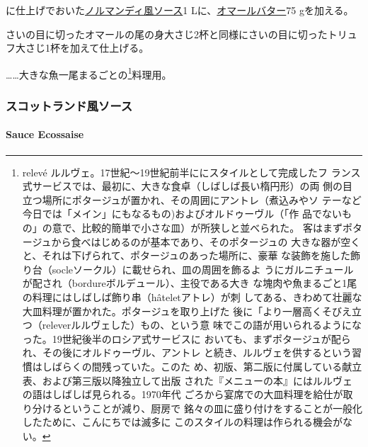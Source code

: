 \begin{recette}
に仕上げでおいた\protect\hyperlink{sauce-normande}{ノルマンディ風ソース}1
Lに、\protect\hyperlink{}{オマールバター}75 gを加える。

さいの目に切ったオマールの尾の身大さじ2杯と同様にさいの目に切ったトリュ
フ大さじ1杯を加えて仕上げる。

\ldots{}\ldots{}大きな魚一尾まるごとの\footnote{relevé
  ルルヴェ。17世紀〜19世紀前半ににスタイルとして完成したフ
  ランス式サービスでは、最初に、大きな食卓（しばしば長い楕円形）の両
  側の目立つ場所にポタージュが置かれ、その周囲にアントレ（煮込みやソ
  テーなど今日では「メイン」にもなるもの)およびオルドゥーヴル（「作
  品でないもの」の意で、比較的簡単で小さな皿）が所狭しと並べられた。
  客はまずポタージュから食べはじめるのが基本であり、そのポタージュの
  大きな器が空くと、それは下げられて、ポタージュのあった場所に、豪華
  な装飾を施した飾り台（socleソークル）に載せられ、皿の周囲を飾るよ
  うにガルニチュールが配され（bordureボルデュール）、主役である大き
  な塊肉や魚まるごと1尾の料理にはしばしば飾り串（hâteletアトレ）が刺
  してある、きわめて壮麗な大皿料理が置かれた。ポタージュを取り上げた
  後に「より一層高くそびえ立つ（releverルルヴェした）もの、という意
  味でこの語が用いられるようになった。19世紀後半のロシア式サービスに
  おいても、まずポタージュが配られ、その後にオルドゥーヴル、アントレ
  と続き、ルルヴェを供するという習慣はしばらくの間残っていた。このた
  め、初版、第二版に付属している献立表、および第三版以降独立して出版
  された『メニューの本』にはルルヴェの語はしばしば見られる。1970年代
  ごろから宴席での大皿料理を給仕が取り分けるということが減り、厨房で
  銘々の皿に盛り付けをすることが一般化したために、こんにちでは滅多に
  このスタイルの料理は作られる機会がない。}料理用。

\maeaki

\hypertarget{ux30b9ux30b3ux30c3ux30c8ux30e9ux30f3ux30c9ux98a8ux30bdux30fcux30b9}{%
\subsubsection{スコットランド風ソース}\label{ux30b9ux30b3ux30c3ux30c8ux30e9ux30f3ux30c9ux98a8ux30bdux30fcux30b9}}

\hypertarget{sauce-ecossaise}{%
\paragraph{Sauce Ecossaise}\label{sauce-ecossaise}}



\end{recette}

